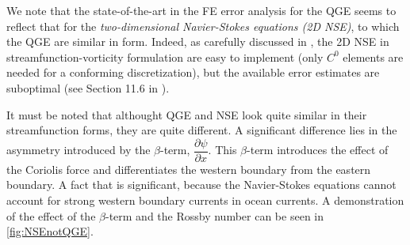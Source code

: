 We note that the state-of-the-art in the FE error analysis for the QGE seems to
reflect that for the \emph{two-dimensional Navier-Stokes equations (2D NSE)}, to
which the QGE are similar in form.  Indeed, as carefully discussed in
\cite{Gunzburger89}, the 2D NSE in streamfunction-vorticity formulation are easy
to implement (only $C^0$ elements are needed for a conforming discretization),
but the available error estimates are suboptimal (see Section 11.6 in
\cite{Gunzburger89}).
\begin{remark}
  It must be noted that althought QGE and NSE look quite similar in their
  streamfunction forms, they are quite different. A significant difference lies
  in the asymmetry introduced by the $\beta$-term, $\dfrac{\partial
  \psi}{\partial x}$. This $\beta$-term introduces the effect of the Coriolis
  force and differentiates the western boundary from the eastern boundary. A
  fact that is significant, because the Navier-Stokes equations cannot account
  for strong western boundary currents in ocean currents. A demonstration of the
  effect of the $\beta$-term and the Rossby number can be seen in
  \autoref{fig:NSEnotQGE}.
\end{remark}

